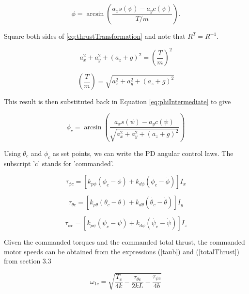 \begin{equation}
    \label{eq:phiIntermediate}
    \phi = \arcsin( \frac{a_x s(\psi) - a_y c(\psi)}{T/m} ).
\end{equation}

Square both sides of \eqref{eq:thrustTransformation} and note that $ R^T = R^{-1}$.

\begin{equation}
a_x^2 + a_y^2 + (a_z + g)^2 = (\frac{T}{m})^2 
\end{equation}

\begin{equation}
(\frac{T}{m}) = \sqrt{a_x^2 + a_y^2 + (a_z + g)^2}
\end{equation}


This result is then substituted back in Equation \eqref{eq:phiIntermediate} to give

\begin{equation}
    \label{eq:phic}
    \phi_c = \arcsin( \frac{a_x s(\psi) - a_y c(\psi)}{\sqrt{a_x^2 + a_y^2 + (a_z + g)^2}} )
\end{equation}


Using $\theta_c$ and $\phi_c$ as set points, we can write the PD angular control laws. The subscript 'c' stands for 'commanded'.

\begin{equation}
    \tau_{\phi c} = [ k_{p\phi} (\phi_c - \phi) + k_{d\phi} (\dot{\phi_c} - \dot{\phi}) ] I_x
\end{equation}

\begin{equation}
    \tau_{\theta c} = [ k_{p\theta} (\theta_c - \theta) + k_{d\theta} (\dot{\theta_c} - \dot{\theta}) ] I_y
\end{equation}

\begin{equation}
    \tau_{\psi c} = [ k_{p\psi} (\psi_c - \psi) + k_{d\psi} (\dot{\psi_c} - \dot{\psi}) ] I_z 
\end{equation}

Given the commanded torques and the commanded total thrust, the commanded motor speeds can be obtained from the expressions (\ref{taub}) and (\ref{totalThrust}) from section 3.3





\begin{equation}
    \omega_{1c} = \sqrt{ \frac{T_c}{4 k} - \frac{ \tau_{\theta c}}{2 k L} - \frac{ \tau_{\psi c} }{4 b } } 
\end{equation}

